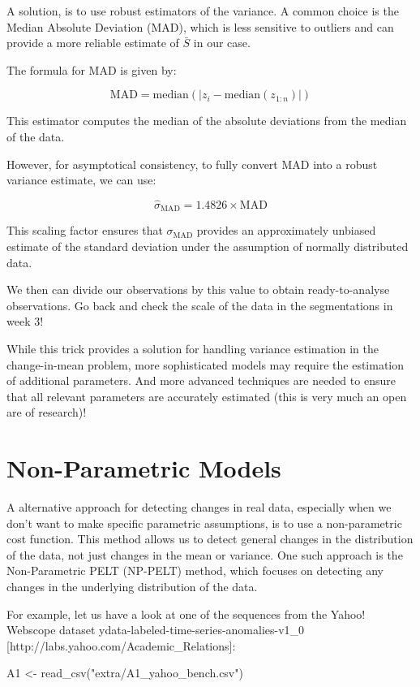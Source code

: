 \documentclass[
  letterpaper,
  DIV=11,
  numbers=noendperiod]{scrreprt}
\newenvironment{Shaded}{\begin{snugshade}}{\end{snugshade}}
\newcommand{\FunctionTok}[1]{\textcolor[rgb]{0.28,0.35,0.67}{#1}}
\newcommand{\NormalTok}[1]{\textcolor[rgb]{0.00,0.23,0.31}{#1}}
\newcommand{\OtherTok}[1]{\textcolor[rgb]{0.00,0.23,0.31}{#1}}
\newcommand{\StringTok}[1]{\textcolor[rgb]{0.13,0.47,0.30}{#1}}
\begin{document}
A solution, is to use robust estimators of the variance. A common choice
is the Median Absolute Deviation (MAD), which is less sensitive to
outliers and can provide a more reliable estimate of \(\bar S\) in our
case.

The formula for MAD is given by:

\[
\text{MAD} = \text{median}(|z_i - \text{median}(z_{1:n})|)
\]

This estimator computes the median of the absolute deviations from the
median of the data.

However, for asymptotical consistency, to fully convert MAD into a
robust variance estimate, we can use:

\[
\hat \sigma_{\text{MAD}} = 1.4826 \times \text{MAD}
\]

This scaling factor ensures that \(\sigma_{\text{MAD}}\) provides an
approximately unbiased estimate of the standard deviation under the
assumption of normally distributed data.

We then can divide our observations by this value to obtain
ready-to-analyse observations. Go back and check the scale of the data
in the segmentations in week 3!

While this trick provides a solution for handling variance estimation in
the change-in-mean problem, more sophisticated models may require the
estimation of additional parameters. And more advanced techniques are
needed to ensure that all relevant parameters are accurately estimated
(this is very much an open are of research)!

\section{Non-Parametric Models}\label{non-parametric-models}

A alternative approach for detecting changes in real data, especially
when we don't want to make specific parametric assumptions, is to use a
non-parametric cost function. This method allows us to detect general
changes in the distribution of the data, not just changes in the mean or
variance. One such approach is the Non-Parametric PELT (NP-PELT) method,
which focuses on detecting any changes in the underlying distribution of
the data.

For example, let us have a look at one of the sequences from the Yahoo!
Webscope dataset ydata-labeled-time-series-anomalies-v1\_0
{[}http://labs.yahoo.com/Academic\_Relations{]}:

\begin{Shaded}
\begin{Highlighting}[]
\NormalTok{A1 }\OtherTok{\textless{}{-}} \FunctionTok{read\_csv}\NormalTok{(}\StringTok{"extra/A1\_yahoo\_bench.csv"}\NormalTok{)}
\end{Highlighting}
\end{Shaded}
\end{document}
